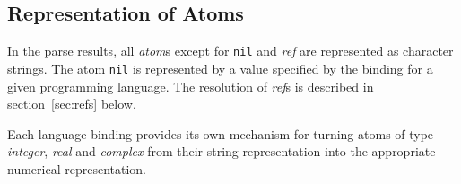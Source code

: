 \documentclass{article}
\begin{document}
        \subsection{Representation of Atoms}
                In the parse results,
                all \emph{atom}s
                except for \texttt{nil} and \emph{ref}
                are represented
                as character strings.
                The atom \texttt{nil} is represented by a 
                value specified by the binding for a given programming language.
                The resolution of \emph{ref}s is described in section~\ref{sec:refs} below.
                \vspace{1mm}
                \par
                Each language binding
                provides its own mechanism
                for turning atoms of type \emph{integer}, \emph{real} and \emph{complex}
                from their string representation
                into the appropriate numerical representation.
\end{document}
